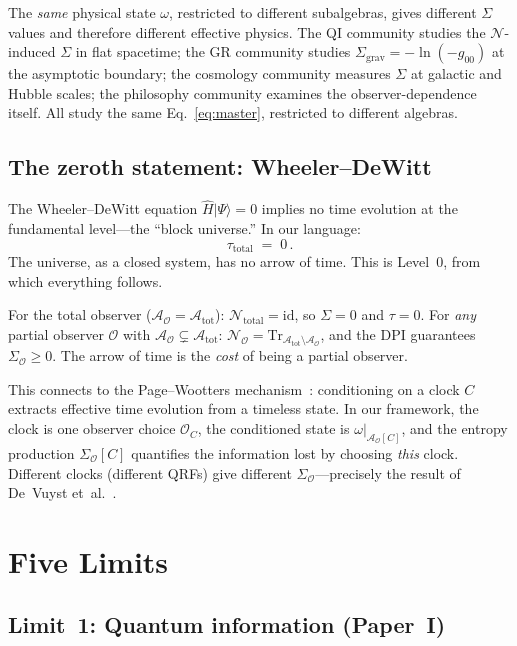 \documentclass[prd,twocolumn,superscriptaddress,longbibliography,floatfix]{revtex4-2}
\newcommand{\Tr}{\mathrm{Tr}}
\newcommand{\id}{\mathrm{id}}
\newcommand{\chan}{\mathcal{N}}
\newcommand{\tauasym}{\tau}
\newcommand{\Sgrav}{\Sigma_{\mathrm{grav}}}
\newcommand{\Aobs}{\mathcal{A}_{\mathcal{O}}}
\newcommand{\Atot}{\mathcal{A}_{\mathrm{tot}}}
\newcommand{\SigO}{\Sigma_{\mathcal{O}}}
\begin{document}
The \emph{same} physical state $\omega$, restricted to
different subalgebras, gives different $\Sigma$ values
and therefore different effective physics.  The QI
community studies the $\chan$-induced $\Sigma$ in flat
spacetime; the GR community studies
$\Sgrav = -\ln(-g_{00})$ at the asymptotic boundary;
the cosmology community measures $\Sigma$ at galactic
and Hubble scales; the philosophy community examines the
observer-dependence itself.  All study the same
Eq.~\eqref{eq:master}, restricted to different algebras.

\subsection{The zeroth statement: Wheeler--DeWitt}

The Wheeler--DeWitt equation
$\hat{H}|\Psi\rangle = 0$ implies no time
evolution at the fundamental level---the ``block universe.''
In our language:
\begin{equation}
\tauasym_{\mathrm{total}} \;=\; 0\,.
\label{eq:zeroth}
\end{equation}
The universe, as a closed system, has no arrow of time.
This is Level~0, from which everything follows.

For the total observer ($\Aobs = \Atot$):
$\chan_{\mathrm{total}} = \id$, so $\Sigma = 0$ and
$\tauasym = 0$.  For \emph{any} partial observer
$\mathcal{O}$ with
$\Aobs \subsetneq \Atot$:
$\chan_{\mathcal{O}} = \Tr_{\Atot \setminus \Aobs}$,
and the DPI guarantees $\SigO \geq 0$.
The arrow of time is the \emph{cost} of being a
partial observer.

This connects to the Page--Wootters
mechanism~\cite{PageWootters1983}: conditioning on a
clock $C$ extracts effective time evolution from a
timeless state.  In our framework, the clock is one
observer choice $\mathcal{O}_C$, the conditioned
state is $\omega|_{\Aobs[C]}$, and the entropy
production $\SigO[C]$ quantifies the information
lost by choosing \emph{this} clock.  Different clocks
(different QRFs) give different $\SigO$---precisely
the result of De~Vuyst et~al.~\cite{DeVuyst2025}.


\section{Five Limits}
\label{sec:limits}

\subsection{Limit~1: Quantum information (Paper~I)}
\label{sec:limit_QI}
\end{document}
